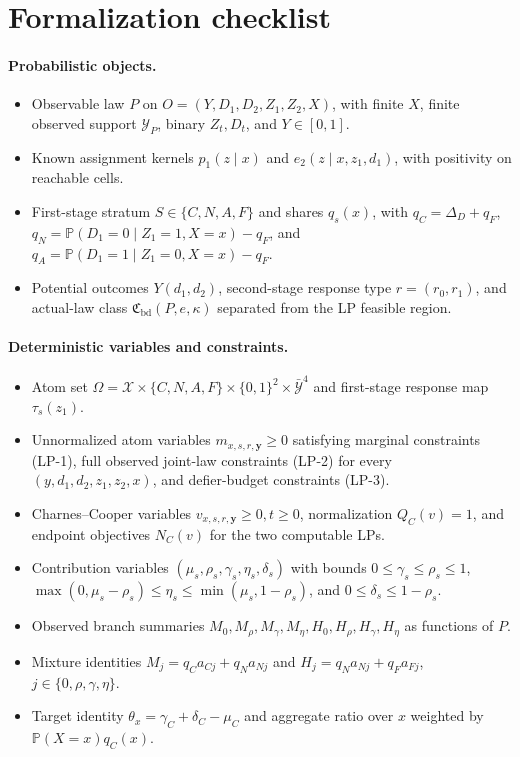 \documentclass[11pt]{article}
\renewcommand{\Pr}{\mathbb{P}}
\theoremstyle{definition}
\theoremstyle{plain}
\theoremstyle{remark}
\begin{document}
\section{Formalization checklist}
\paragraph{Probabilistic objects.}
\begin{itemize}[leftmargin=*]
\item Observable law \(P\) on \(O=(Y,D_1,D_2,Z_1,Z_2,X)\), with finite \(X\), finite observed support \(\mathcal Y_P\), binary \(Z_t,D_t\), and \(Y\in[0,1]\).
\item Known assignment kernels \(p_1(z\mid x)\) and \(e_2(z\mid x,z_1,d_1)\), with positivity on reachable cells.
\item First-stage stratum \(S\in\{C,N,A,F\}\) and shares \(q_s(x)\), with \(q_C=\Delta_D+q_F\), \(q_N=\Pr(D_1=0\mid Z_1=1,X=x)-q_F\), and \(q_A=\Pr(D_1=1\mid Z_1=0,X=x)-q_F\).
\item Potential outcomes \(Y(d_1,d_2)\), second-stage response type \(r=(r_0,r_1)\), and actual-law class \(\mathfrak C_{\mathrm{bd}}(P,e,\kappa)\) separated from the LP feasible region.
\end{itemize}

\paragraph{Deterministic variables and constraints.}
\begin{itemize}[leftmargin=*]
\item Atom set \(\Omega=\mathcal X\times\{C,N,A,F\}\times\{0,1\}^2\times\bar{\mathcal Y}^{4}\) and first-stage response map \(\tau_s(z_1)\).
\item Unnormalized atom variables \(m_{x,s,r,\mathbf y}\ge0\) satisfying marginal constraints (LP-1), full observed joint-law constraints (LP-2) for every \((y,d_1,d_2,z_1,z_2,x)\), and defier-budget constraints (LP-3).
\item Charnes--Cooper variables \(v_{x,s,r,\mathbf y}\ge0,t\ge0\), normalization \(Q_C(v)=1\), and endpoint objectives \(N_C(v)\) for the two computable LPs.
\item Contribution variables \((\mu_s,\rho_s,\gamma_s,\eta_s,\delta_s)\) with bounds \(0\le\gamma_s\le\rho_s\le1\), \(\max(0,\mu_s-\rho_s)\le\eta_s\le\min(\mu_s,1-\rho_s)\), and \(0\le\delta_s\le1-\rho_s\).
\item Observed branch summaries \(M_0,M_\rho,M_\gamma,M_\eta,H_0,H_\rho,H_\gamma,H_\eta\) as functions of \(P\).
\item Mixture identities \(M_j=q_Ca_{Cj}+q_Na_{Nj}\) and \(H_j=q_Na_{Nj}+q_Fa_{Fj}\), \(j\in\{0,\rho,\gamma,\eta\}\).
\item Target identity \(\theta_x=\gamma_C+\delta_C-\mu_C\) and aggregate ratio over \(x\) weighted by \(\Pr(X=x)q_C(x)\).
\end{itemize}
\end{document}
